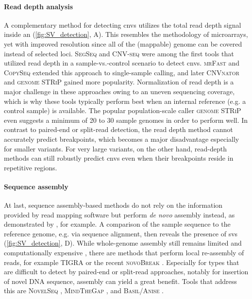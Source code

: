 \paragraph{Read depth analysis}
A complementary method for detecting \acp{cnv} utilizes the total read depth
signal inside an \sv  (\cref{fig:SV_detection}, A). This resembles the
methodology of microarrays, yet with
improved resolution since all of the (mappable) genome can be covered instead
of selected loci. \textsc{SegSeq} \citep{Chiang2009} and \textsc{CNV-seq}
\citep{Xie2009} were among the first tools that utilized read depth in a
sample-vs.-control scenario to detect \acp{cnv}. \textsc{mrFast}
\citep{Alkan2009} and \textsc{CopySeq} \citep{Waszak2010} extended this
approach to single-sample \cnv calling, and later \textsc{CNVnator}
\citep{Abyzov2011} and \textsc{genome STRiP} \citep{Handsaker2015} gained more
popularity. Normalization of read depth is a major challenge in these approaches
owing to an uneven sequencing coverage, which is why these tools typically
perform best when an internal reference (e.g. a control sample) is available.
The popular population-scale \cnv caller \textsc{genome STRiP} even
suggests a minimum of 20 to 30 sample genomes in order to perform well. In
contrast to paired-end or split-read detection, the read depth method cannot
accurately predict breakpoints, which becomes a major disadvantage especially
for smaller variants. For very large variants, on the other hand, read-depth
methods can still robustly predict \acp{cnv} even when their breakpoints reside
in repetitive regions.

\paragraph{Sequence assembly} At last, sequence assembly-based methods do not rely on the
information provided by read mapping software but perform \textit{de novo}
assembly instead, as demonstrated by \citet{Li2011a}, for example. A comparison
of the sample sequence to the reference genome, e.g. via sequence alignment, then
reveals the presence of \acp{sv}  (\cref{fig:SV_detection}, D).
While whole-genome assembly still remains limited and computationally expensive
\citep{Bradnam2013}, there are methods that perform local re-assembly of reads,
for example \textsc{TIGRA} \citep{Chen2014b} or the recent \textsc{novoBreak}
\citep{Chong2017}. Especially for \sv types that are difficult to detect by
paired-end or split-read approaches, notably for insertion of novel DNA sequence,
assembly can yield a great benefit. Tools that address this are \textsc{NovelSeq}
\citep{Hajirasouliha2010}, \textsc{MindTheGap} \citep{Rizk2014}, and
\textsc{Basil/Anise} \citep{Holtgrewe2015}.
\pagebreak[1]

